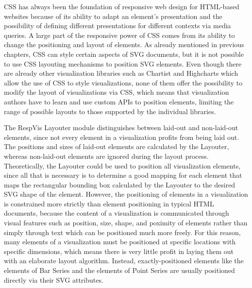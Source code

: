 CSS has always been the foundation of responsive web design for
HTML-based websites because of its ability to adapt an element's
presentation and the possibility of defining different presentations
for different contexts via media queries. A large part of the
responsive power of CSS comes from its ability to change the
positioning and layout of elements. As already mentioned in previous
chapters, CSS can style certain aspects of SVG documents, but it is
not possible to use CSS layouting mechanisms to position SVG elements.
Even though there are already other visualization libraries such as
Chartist \parencite{Chartist} and Highcharts \parencite{Highcharts}
which allow the use of CSS to style visualizations, none of them offer
the possibility to modify the layout of visualizations via CSS, which
means that visualization authors have to learn and use custom APIs to
position elements, limiting the range of possible layouts to those
supported by the individual libraries.

The RespVis Layouter module distinguishes between laid-out
and non-laid-out elements, since not every element in a visualization
profits from being laid out. The positions and sizes of laid-out
elements are calculated by the Layouter, whereas
non-laid-out elements are ignored during the layout process.
Theoretically, the Layouter could be used to position all
visualization elements, since all that is necessary is to determine a
good mapping for each element that maps the rectangular bounding box
calculated by the Layouter to the desired SVG shape of the
element. However, the positioning of elements in a visualization is
constrained more strictly than element positioning in typical HTML
documents, because the content of a visualization is communicated
through visual features such as position, size, shape, and poximity of
elements rather than simply through text which can be positioned much
more freely. For this reason, many elements of a visualization must be
positioned at specific locations with specific dimensions, which means
there is very little profit in laying them out with an elaborate
layout algorithm. Instead, exactly-positioned elements like the
 elements of Bar Series and the 
elements of Point Series are usually positioned directly via their SVG
attributes.


